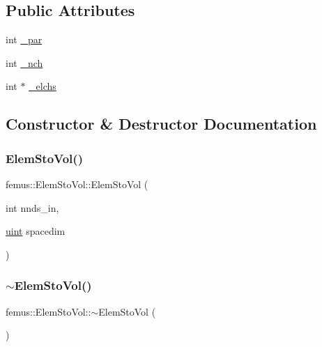 \subsection*{Public Attributes}
\begin{DoxyCompactItemize}
\item 
int \mbox{\hyperlink{classfemus_1_1_elem_sto_vol_a452494c41098efc1170394e89c1ce8a8}{\+\_\+par}}
\item 
int \mbox{\hyperlink{classfemus_1_1_elem_sto_vol_ae157383dd2c483093c6354fbfc1d0116}{\+\_\+nch}}
\item 
int $\ast$ \mbox{\hyperlink{classfemus_1_1_elem_sto_vol_a4800376b85eeccc97f7c12c5c91a8070}{\+\_\+elchs}}
\end{DoxyCompactItemize}


\subsection{Constructor \& Destructor Documentation}
\mbox{\label{classfemus_1_1_elem_sto_vol_a8bcc9da426122d9905a5ce0071f7398f}} 
\subsubsection{\texorpdfstring{Elem\+Sto\+Vol()}{ElemStoVol()}}
{\footnotesize\ttfamily femus\+::\+Elem\+Sto\+Vol\+::\+Elem\+Sto\+Vol (\begin{DoxyParamCaption}\item[{int}]{nnds\+\_\+in,  }\item[{\mbox{\hyperlink{_typedefs_8hpp_a91ad9478d81a7aaf2593e8d9c3d06a14}{uint}}}]{spacedim }\end{DoxyParamCaption})}

\mbox{\label{classfemus_1_1_elem_sto_vol_a9a35cdb47e6ea0c722ae92c868f06983}} 
\subsubsection{\texorpdfstring{$\sim$\+Elem\+Sto\+Vol()}{~ElemStoVol()}}
{\footnotesize\ttfamily femus\+::\+Elem\+Sto\+Vol\+::$\sim$\+Elem\+Sto\+Vol (\begin{DoxyParamCaption}{ }\end{DoxyParamCaption})}



